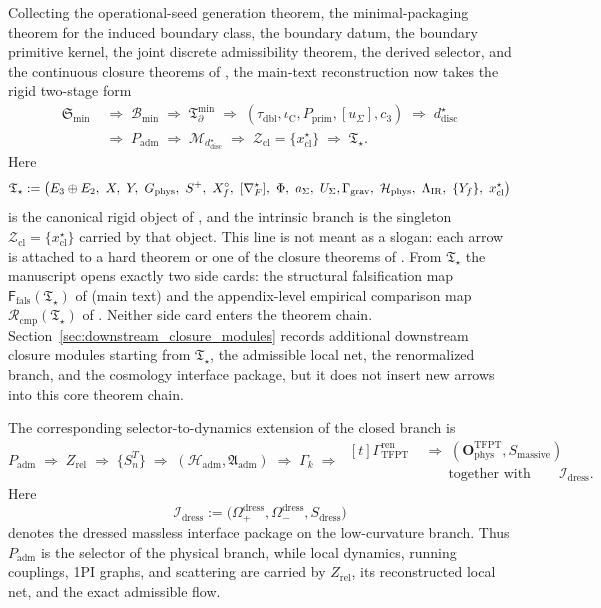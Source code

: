 \documentclass[11pt,a4paper]{article}
\theoremstyle{definition}
\theoremstyle{remark}
\newcommand{\taudbl}{\tau_{\mathrm{dbl}}}
\newcommand{\iC}{\iota_{\mathrm C}}
\newcommand{\cthree}{c_3}
\newcommand{\Tbound}{\mathfrak T_{\partial}^{\min}}
\newcommand{\Padm}{P_{\mathrm{adm}}}
\newcommand{\Pprim}{P_{\mathrm{prim}}}
\newcommand{\Tstar}{\mathfrak T_{\star}}
\newcommand{\Ffals}{\mathsf F_{\mathrm{fals}}}
\newcommand{\Rcmp}{\mathcal R_{\mathrm{cmp}}}
\newcommand{\OphysTFPT}{\mathbf O_{\mathrm{phys}}^{\mathrm{TFPT}}}
\begin{document}
Collecting the operational-seed generation theorem, the minimal-packaging theorem for the induced
boundary class, the boundary datum, the
boundary primitive kernel, the joint discrete admissibility theorem, the derived selector, and the continuous closure
theorems of
, the main-text reconstruction now takes the rigid two-stage form
\begin{equation}
\label{eq:closed-output-chain}
\begin{aligned}
\mathfrak S_{\min}
&\;\Rightarrow\;
\mathcal B_{\min}
\;\Rightarrow\;
\Tbound
\;\Rightarrow\;
(\taudbl,\iC,\Pprim,[u_\Sigma],\cthree)
\;\Rightarrow\;
d^\star_{\mathrm{disc}}
\\
&\;\Rightarrow\;
\Padm
\;\Rightarrow\;
\mathcal M_{d^\star_{\mathrm{disc}}}
\;\Rightarrow\;
\mathcal Z_{\mathrm{cl}}=\{x^\star_{\mathrm{cl}}\}
\;\Rightarrow\;
\Tstar.
\end{aligned}
\end{equation}
Here
\[
\Tstar
:=
\bigl(
E_3\oplus E_2,\ X,\ Y,\ G_{\mathrm{phys}},\ S^+,\ X_f^\circ,\ [\nabla_F^\star],\ \Phi,\ a_\Sigma,\ U_\Sigma,\\
\Gamma_{\mathrm{grav}},\ \mathcal H_{\mathrm{phys}},\ \Lambda_{\mathrm{IR}},\ \{Y_f\},\ x_{\mathrm{cl}}^\star
\bigr)
\]
is the canonical rigid object of , and the intrinsic branch is
the singleton $\mathcal Z_{\mathrm{cl}}=\{x_{\mathrm{cl}}^\star\}$ carried by that object.
This line is not meant as a slogan: each arrow is attached to a hard theorem or one of the
closure theorems of . From $\Tstar$ the manuscript opens exactly two
side cards: the structural falsification map $\Ffals(\Tstar)$ of
 (main text) and the appendix-level empirical comparison
map $\Rcmp(\Tstar)$ of . Neither side card enters the
theorem chain.
Section~\ref{sec:downstream_closure_modules} records additional downstream closure modules starting
from $\Tstar$, the admissible local net, the renormalized branch, and the cosmology interface
package, but it does not insert new arrows into this core theorem chain.

The corresponding selector-to-dynamics extension of the closed branch is
\[
\Padm
\;\Rightarrow\;
Z_{\mathrm{rel}}
\;\Rightarrow\;
\{S_n^T\}
\;\Rightarrow\;
(\mathcal H_{\mathrm{adm}},\mathfrak A_{\mathrm{adm}})
\;\Rightarrow\;
\Gamma_k
\;\Rightarrow\;
\begin{aligned}[t]
\Gamma_{\mathrm{TFPT}}^{\mathrm{ren}}
&\;\Rightarrow\;
(\OphysTFPT,S_{\mathrm{massive}})\\
&\qquad\text{together with}\qquad
\mathcal I_{\mathrm{dress}}.
\end{aligned}
\]
Here
\[
\mathcal I_{\mathrm{dress}}
:=
\bigl(\Omega_+^{\mathrm{dress}},\Omega_-^{\mathrm{dress}},S_{\mathrm{dress}}\bigr)
\]
denotes the dressed massless interface package on the low-curvature branch.
Thus $\Padm$ is the selector of the physical branch, while local dynamics, running couplings, 1PI
graphs, and scattering are carried by $Z_{\mathrm{rel}}$, its reconstructed local net, and the
exact admissible flow.
\end{document}

